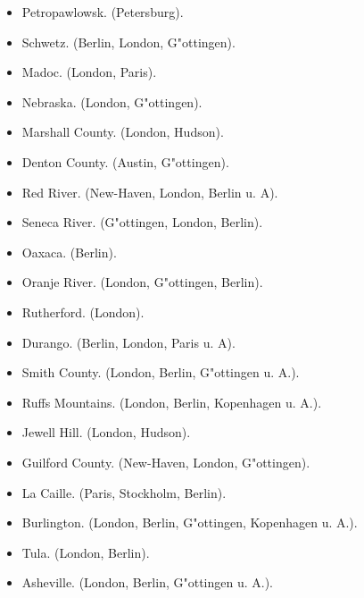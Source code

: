 \documentclass[a4paper, 11pt, oneside]{article}
\begin{document}
\begin{itemize}
\begin{itemize}
        \item Petropawlowsk. (Petersburg).
    
        \item Schwetz. (Berlin, London, G"ottingen).
    
        \item Madoc. (London, Paris).
    
        \item Nebraska. (London, G"ottingen).
    
        \item Marshall County. (London, Hudson).
    
        \item Denton County. (Austin, G"ottingen).
    
        \item Red River. (New-Haven, London, Berlin u. A).
    
        \item Seneca River. (G"ottingen, London, Berlin).
    
        \item Oaxaca. (Berlin).
    
        \item Oranje River. (London, G"ottingen, Berlin).
    
        \item Rutherford. (London).
    
        \item Durango. (Berlin, London, Paris u. A).
    
        \item Smith County. (London, Berlin, G"ottingen u. A.).
    
        \item Ruffs Mountains. (London, Berlin, Kopenhagen u. A.).
    
        \item Jewell Hill. (London, Hudson).
    
        \item Guilford County. (New-Haven, London, G"ottingen).
    
        \item La Caille. (Paris, Stockholm, Berlin).
    
        \item Burlington. (London, Berlin, G"ottingen, Kopenhagen u. A.).
    
        \item Tula. (London, Berlin).
    
        \item Asheville. (London, Berlin, G"ottingen u. A.).
    

\end{itemize}
\end{itemize}
\end{document}
